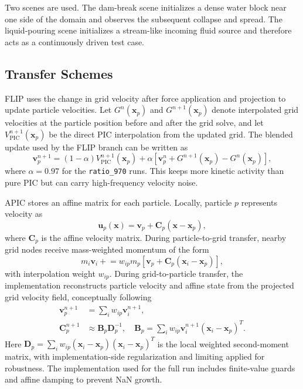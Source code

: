 \documentclass[conference]{IEEEtran}
\begin{document}
Two scenes are used. The dam-break scene initializes a dense water block near one side of the domain and observes the subsequent collapse and spread. The liquid-pouring scene initializes a stream-like incoming fluid source and therefore acts as a continuously driven test case.

\subsection{Transfer Schemes}

FLIP uses the change in grid velocity after force application and projection to update particle velocities. Let $G^n(\mathbf{x}_p)$ and $G^{n+1}(\mathbf{x}_p)$ denote interpolated grid velocities at the particle position before and after the grid solve, and let $V_{\mathrm{PIC}}^{n+1}(\mathbf{x}_p)$ be the direct PIC interpolation from the updated grid. The blended update used by the FLIP branch can be written as
\begin{equation}
\mathbf{v}_p^{n+1}
= (1-\alpha) V_{\mathrm{PIC}}^{n+1}(\mathbf{x}_p)
+ \alpha \left[\mathbf{v}_p^n + G^{n+1}(\mathbf{x}_p)-G^n(\mathbf{x}_p)\right],
\label{eq:flip}
\end{equation}
where $\alpha=0.97$ for the \texttt{ratio\_970} runs. This keeps more kinetic activity than pure PIC but can carry high-frequency velocity noise.

APIC stores an affine matrix for each particle. Locally, particle $p$ represents velocity as
\begin{equation}
\mathbf{u}_p(\mathbf{x})
= \mathbf{v}_p + \mathbf{C}_p(\mathbf{x}-\mathbf{x}_p),
\label{eq:apic-local}
\end{equation}
where $\mathbf{C}_p$ is the affine velocity matrix. During particle-to-grid transfer, nearby grid nodes receive mass-weighted momentum of the form
\begin{equation}
m_i\mathbf{v}_i
\mathrel{+}= w_{ip}m_p
\left[\mathbf{v}_p+\mathbf{C}_p(\mathbf{x}_i-\mathbf{x}_p)\right],
\label{eq:apic-p2g}
\end{equation}
with interpolation weight $w_{ip}$. During grid-to-particle transfer, the implementation reconstructs particle velocity and affine state from the projected grid velocity field, conceptually following
\begin{equation}
\begin{aligned}
\mathbf{v}_p^{n+1} &= \sum_i w_{ip}\mathbf{v}_i^{n+1},\\
\mathbf{C}_p^{n+1} &\approx \mathbf{B}_p\mathbf{D}_p^{-1}, \quad
\mathbf{B}_p = \sum_i w_{ip}\mathbf{v}_i^{n+1}
(\mathbf{x}_i-\mathbf{x}_p)^{T}.
\end{aligned}
\label{eq:apic-g2p}
\end{equation}
Here $\mathbf{D}_p = \sum_i w_{ip}(\mathbf{x}_i-\mathbf{x}_p)(\mathbf{x}_i-\mathbf{x}_p)^T$ is the local weighted second-moment matrix, with implementation-side regularization and limiting applied for robustness.
The implementation used for the full run includes finite-value guards and affine damping to prevent NaN growth.
\end{document}
